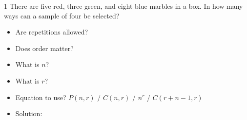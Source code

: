 \documentclass[a4paper,12pt]{book}
\newcounter{question}
\begin{document}
        \hrulefill

        \begin{question}{\thequestion}{1}
            There are five red, three green, and eight blue marbles in a box.
            In how many ways can a sample of four be selected?

            \begin{itemize}
                \item[]     Are repetitions allowed?    
                \item[]     Does order matter?          
                \item[]     What is $n$?                
                \item[]     What is $r$?                
                \item[]     Equation to use? $P(n,r)$ / $C(n,r)$ / $n^{r}$ / $C(r+n-1,r)$            
                \item[]     Solution: 
            \end{itemize}
        \end{question}

        \hrulefill
\end{document}
